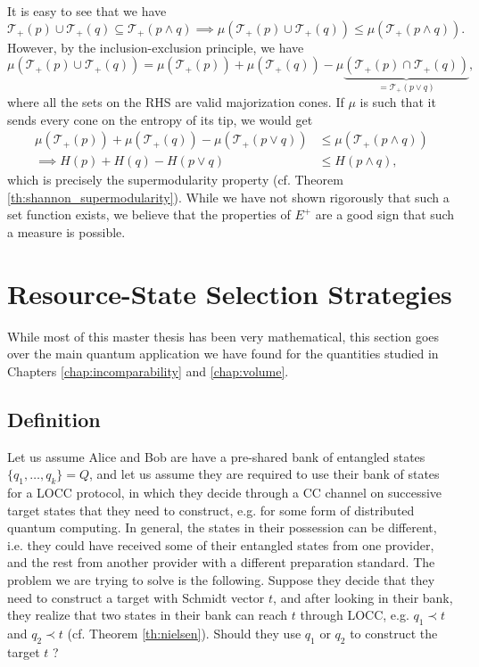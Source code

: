 It is easy to see that we have
\begin{equation}
    \mathcal{T}_+(p) \cup \mathcal{T}_+(q) \subseteq \mathcal{T}_+(p \wedge q) \implies \mu\left(\mathcal{T}_+(p) \cup \mathcal{T}_+(q)\right) \leq \mu\left(\mathcal{T}_+(p \wedge q)\right).
\end{equation}
\noindent However, by the inclusion-exclusion principle, we have 
\begin{equation}
    \mu\left(\mathcal{T}_+(p) \cup \mathcal{T}_+(q)\right) = \mu\left(\mathcal{T}_+(p)\right) + \mu\left(\mathcal{T}_+(q)\right) - \mu\underbrace{\left(\mathcal{T}_+(p) \cap \mathcal{T}_+(q)\right)}_{= \mathcal{T}_+(p \vee q)},
\end{equation}
\noindent where all the sets on the RHS are valid majorization cones. If $\mu$ is such that it sends every cone on the entropy of its tip, we would get
\begin{align}
    \mu\left(\mathcal{T}_+(p)\right) + \mu\left(\mathcal{T}_+(q)\right) - \mu\left(\mathcal{T}_+(p \vee q)\right) &\leq \mu\left(\mathcal{T}_+(p \wedge q)\right)\\
    \implies H(p) + H(q) - H(p \vee q) &\leq H(p \wedge q),
\end{align}
\noindent which is precisely the supermodularity property (cf. Theorem \ref{th:shannon_supermodularity}). While we have not shown rigorously that such a set function exists, we believe that the properties of $E^+$ are a good sign that such a measure is possible.



\section{Resource-State Selection Strategies} \label{sec:strategies}

While most of this master thesis has been very mathematical, this section goes over the main quantum application we have found for the quantities studied in Chapters \ref{chap:incomparability} and \ref{chap:volume}.



\subsection{Definition}

Let us assume Alice and Bob are have a pre-shared bank of entangled states $\{q_1, \dots, q_k\} = Q$, and let us assume they are required to use their bank of states for a LOCC protocol, in which they decide through a CC channel on successive target states that they need to construct, e.g. for some form of distributed quantum computing. In general, the states in their possession can be different, i.e. they could have received some of their entangled states from one provider, and the rest from another provider with a different preparation standard. The problem we are trying to solve is the following. Suppose they decide that they need to construct a target with Schmidt vector $t$, and after looking in their bank, they realize that two states in their bank can reach $t$ through LOCC, e.g. $q_1 \prec t$ and $q_2 \prec t$ (cf. Theorem \ref{th:nielsen}). Should they use $q_1$ or $q_2$ to construct the target $t$ ?

